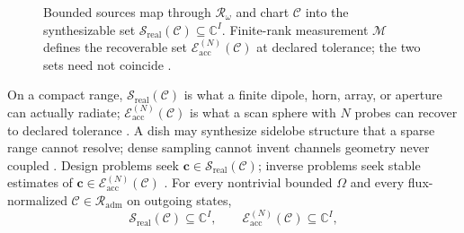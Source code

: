 \begin{figure}[t]
\centering
{}
\caption{Bounded sources map through $\mathcal{R}_\omega$ and chart $\mathcal{C}$ into the synthesizable set $\mathcal{S}_{\mathrm{real}}(\mathcal{C})\subseteq\mathbb{C}^{I}$. Finite-rank measurement $\mathcal{M}$ defines the recoverable set $\mathcal{E}_{\mathrm{acc}}^{(N)}(\mathcal{C})$ at declared tolerance; the two sets need not coincide \cite{stratton1941,hansen1988}.}
\label{fig:ch4.synthesis-accessibility-sets}
\end{figure}
On a compact range, $\mathcal{S}_{\mathrm{real}}(\mathcal{C})$ is what a finite dipole, horn, array, or aperture can actually radiate; $\mathcal{E}_{\mathrm{acc}}^{(N)}(\mathcal{C})$ is what a scan sphere with $N$ probes can recover to declared tolerance \cite{stratton1941}. A dish may synthesize sidelobe structure that a sparse range cannot resolve; dense sampling cannot invent channels geometry never coupled \cite{hansen1988}. Design problems seek $\mathbf{c}\in\mathcal{S}_{\mathrm{real}}(\mathcal{C})$; inverse problems seek stable estimates of $\mathbf{c}\in\mathcal{E}_{\mathrm{acc}}^{(N)}(\mathcal{C})$ \cite{devaney2004}.
\label{prop:ch4.proper-restriction}
For every nontrivial bounded \(\Omega\) and every flux-normalized \(\mathcal{C}\in\mathcal{R}_{\mathrm{adm}}\)
on outgoing states,
\begin{equation}
\label{eq:ch4.nested-restriction}
\mathcal{S}_{\mathrm{real}}(\mathcal{C})
\subseteq
\mathbb{C}^{I},
\qquad
\mathcal{E}_{\mathrm{acc}}^{(N)}(\mathcal{C})
\subseteq
\mathbb{C}^{I},
\end{equation}
